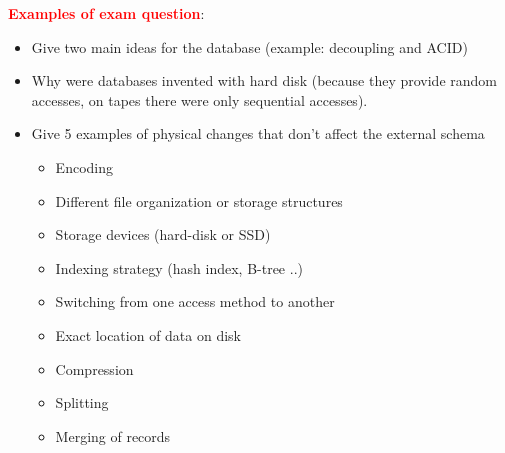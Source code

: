 \textbf{\textcolor{red}{Examples of exam question}}:
\begin{itemize}
    \item Give two main ideas for the database (example: decoupling and ACID)
    \item Why were databases invented with hard disk (because they provide random accesses, on tapes there were only sequential accesses).
    \item Give 5 examples of physical changes that don't affect the external schema 
    \begin{itemize}
        \item Encoding
        \item Different file organization or storage structures
        \item Storage devices (hard-disk or SSD)
        \item Indexing strategy (hash index, B-tree ..)
        \item Switching from one access method to another
        \item Exact location of data on disk
        \item Compression
        \item Splitting
        \item Merging of records
    \end{itemize}

\end{itemize}